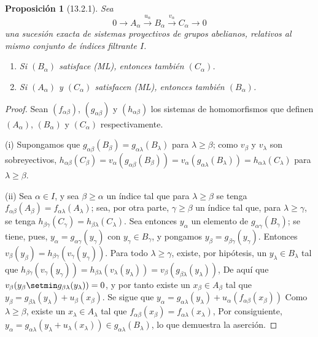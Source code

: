 \documentclass[10pt,oneside,openany]{book}
\theoremstyle{egaenv}\newtheorem*{env}{---}
\theoremstyle{egastatement}
\newtheorem*{proposition}{Proposición}
\theoremstyle{egadescription}
\newcommand{\oldpage}[2][]{\marginnote{\normalfont\scriptsize\textbf{#1}\,|\,#2}\ignorespaces}
\renewcommand{\geq}{\geqslant}
\begin{document}
\begin{proposition}[13.2.1]
\label{0.13.2.1}
\label{0.13.2.1-fr}
Sea
\[
0\longrightarrow A_\alpha\xrightarrow{u_\alpha}B_\alpha
\xrightarrow{v_\alpha}C_\alpha\longrightarrow0
\]
una sucesión exacta de sistemas proyectivos de grupos abelianos, relativos
al mismo conjunto de índices filtrante $I$.
\begin{enumerate}
  \item[{\rm(i)}]
  Si $(B_\alpha)$ satisface {\rm(ML)}, entonces también $(C_\alpha)$.
  \item[{\rm(ii)}]
  Si $(A_\alpha)$ y $(C_\alpha)$ satisfacen {\rm(ML)}, entonces también
  $(B_\alpha)$.
\end{enumerate}
\end{proposition}

\begin{proof}
Sean $(f_{\alpha\beta})$, $(g_{\alpha\beta})$ y
$(h_{\alpha\beta})$ los sistemas de homomorfismos que definen
$(A_\alpha)$, $(B_\alpha)$ y $(C_\alpha)$ respectivamente.

(i) Supongamos que $g_{\alpha\beta}(B_\beta)=g_{\alpha\lambda}(B_\lambda)$ para $\lambda\geq\beta$; como $v_\beta$ y $v_\lambda$ son sobreyectivos,
$h_{\alpha\beta}(C_\beta)=v_\alpha(g_{\alpha\beta}(B_\beta))=v_\alpha(g_{\alpha\lambda}(B_\lambda))=h_{\alpha\lambda}(C_\lambda)$
para $\lambda\geq\beta$.

(ii) Sea $\alpha\in I$, y sea $\beta\geq\alpha$ un índice tal que para $\lambda\geq\beta$ se tenga $f_{\alpha\beta}(A_\beta)=f_{\alpha\lambda}(A_\lambda)$; sea, por otra parte, $\gamma\geq\beta$ un índice tal que, para $\lambda\geq\gamma$, se tenga $h_{\beta\gamma}(C_\gamma)=h_{\beta\lambda}(C_\lambda)$. Sea entonces $y_\alpha$ un elemento de $g_{\alpha\gamma}(B_\gamma)$; se tiene, pues,
$y_\alpha=g_{\alpha\gamma}(y_\gamma)$ con $y_\gamma\in B_\gamma$,
y pongamos $y_\beta=g_{\beta\gamma}(y_\gamma)$.
Entonces
$v_\beta(y_\beta)=h_{\beta\gamma}(v_\gamma(y_\gamma))$.
Para todo $\lambda\geq\gamma$, existe, por hipótesis, un
$y_\lambda\in B_\lambda$ tal que
$h_{\beta\gamma}(v_\gamma(y_\gamma))
=h_{\beta\lambda}(v_\lambda(y_\lambda))
=v_\beta(g_{\beta\lambda}(y_\lambda))$,
De aquí que
$v_\beta(y_\beta\setmin g_{\beta\lambda}(y_\lambda))=0$, y por tanto
existe un $x_\beta\in A_\beta$
\oldpage[0\textsubscript{III}]{66}
tal que
$y_\beta=g_{\beta\lambda}(y_\lambda)+u_\beta(x_\beta)$.
Se sigue que
$y_\alpha=g_{\alpha\lambda}(y_\lambda)+u_\alpha(f_{\alpha\beta}(x_\beta))$
Como $\lambda\geq\beta$, existe un $x_\lambda\in A_\lambda$ tal
que
$f_{\alpha\beta}(x_\beta)=f_{\alpha\lambda}(x_\lambda)$,
Por consiguiente,
$y_\alpha=g_{\alpha\lambda}(y_\lambda+u_\lambda(x_\lambda))\in g_{\alpha\lambda}(B_\lambda)$,
lo que demuestra la aserción.
\end{proof}
\end{document}
